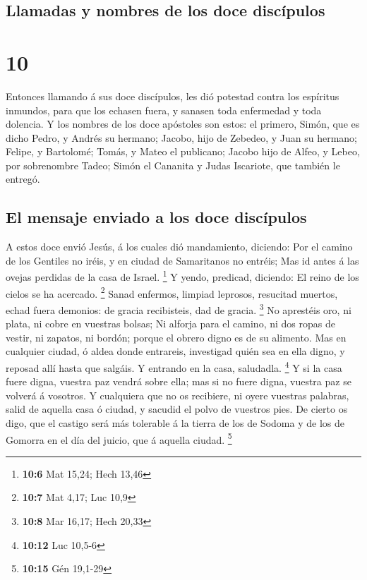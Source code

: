 \hypertarget{llamadas-y-nombres-de-los-doce-discuxedpulos}{%
\subsection{Llamadas y nombres de los doce
discípulos}\label{llamadas-y-nombres-de-los-doce-discuxedpulos}}

\hypertarget{section-9}{%
\section{10}\label{section-9}}

 Entonces llamando á sus doce discípulos, les dió potestad
contra los espíritus inmundos, para que los echasen fuera, y sanasen
toda enfermedad y toda dolencia.  Y los nombres de los doce
apóstoles son estos: el primero, Simón, que es dicho Pedro, y Andrés su
hermano; Jacobo, hijo de Zebedeo, y Juan su hermano; 
Felipe, y Bartolomé; Tomás, y Mateo el publicano; Jacobo hijo de Alfeo,
y Lebeo, por sobrenombre Tadeo;  Simón el Cananita y Judas
Iscariote, que también le entregó.

\hypertarget{el-mensaje-enviado-a-los-doce-discuxedpulos}{%
\subsection{El mensaje enviado a los doce
discípulos}\label{el-mensaje-enviado-a-los-doce-discuxedpulos}}

 A estos doce envió Jesús, á los cuales dió mandamiento,
diciendo: Por el camino de los Gentiles no iréis, y en ciudad de
Samaritanos no entréis;  Mas id antes á las ovejas perdidas
de la casa de Israel. \footnote{\textbf{10:6} Mat 15,24; Hech 13,46}
 Y yendo, predicad, diciendo: El reino de los cielos se ha
acercado. \footnote{\textbf{10:7} Mat 4,17; Luc 10,9}  Sanad
enfermos, limpiad leprosos, resucitad muertos, echad fuera demonios: de
gracia recibisteis, dad de gracia. \footnote{\textbf{10:8} Mar 16,17;
  Hech 20,33}  No aprestéis oro, ni plata, ni cobre en
vuestras bolsas;  Ni alforja para el camino, ni dos ropas
de vestir, ni zapatos, ni bordón; porque el obrero digno es de su
alimento.  Mas en cualquier ciudad, ó aldea donde
entrareis, investigad quién sea en ella digno, y reposad allí hasta que
salgáis.  Y entrando en la casa, saludadla. \footnote{\textbf{10:12}
  Luc 10,5-6}  Y si la casa fuere digna, vuestra paz vendrá
sobre ella; mas si no fuere digna, vuestra paz se volverá á vosotros.
 Y cualquiera que no os recibiere, ni oyere vuestras
palabras, salid de aquella casa ó ciudad, y sacudid el polvo de vuestros
pies.  De cierto os digo, que el castigo será más tolerable
á la tierra de los de Sodoma y de los de Gomorra en el día del juicio,
que á aquella ciudad. \footnote{\textbf{10:15} Gén 19,1-29}

